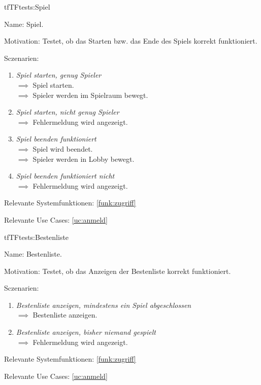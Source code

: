 \begin{description}[leftmargin=5em, style=sameline]

\begin{lhp}{tf}{TF}{tests:Spiel}
	\item [Name:] Spiel.
	\item [Motivation:] Testet, ob das Starten bzw. das Ende des Spiels korrekt funktioniert.
	\item [Sczenarien:] \hfill
		\begin{enumerate}
			\item \textit{Spiel starten, genug Spieler} \\ $\implies$ Spiel starten.
														\\ $\implies$ Spieler werden im Spielraum bewegt.
			\item \textit{Spiel starten, nicht genug Spieler} \\ $\implies$ Fehlermeldung wird angezeigt.
			\item \textit{Spiel beenden funktioniert} \\ $\implies$ Spiel wird  beendet.
													  \\ $\implies$ Spieler werden  in Lobby bewegt.
			\item \textit{Spiel beenden funktioniert nicht} \\ $\implies$ Fehlermeldung wird angezeigt.
		\end{enumerate}
	\item [Relevante Systemfunktionen:] \ref{funk:zugriff}
	\item [Relevante Use Cases:] \ref{uc:anmeld}
\end{lhp}

\end{description}


\begin{description}[leftmargin=5em, style=sameline]

\begin{lhp}{tf}{TF}{tests:Bestenliste}
	\item [Name:] Bestenliste.
	\item [Motivation:] Testet, ob das Anzeigen der Bestenliste  korrekt funktioniert.
	\item [Sczenarien:] \hfill
		\begin{enumerate}
			\item \textit{Bestenliste anzeigen, mindestens ein Spiel abgeschlossen} \\ $\implies$ Bestenliste anzeigen.
			\item \textit{Bestenliste anzeigen, bisher niemand gespielt} \\ $\implies$ Fehlermeldung wird angezeigt.
		\end{enumerate}
	\item [Relevante Systemfunktionen:] \ref{funk:zugriff}
	\item [Relevante Use Cases:] \ref{uc:anmeld}
\end{lhp}

\end{description}


